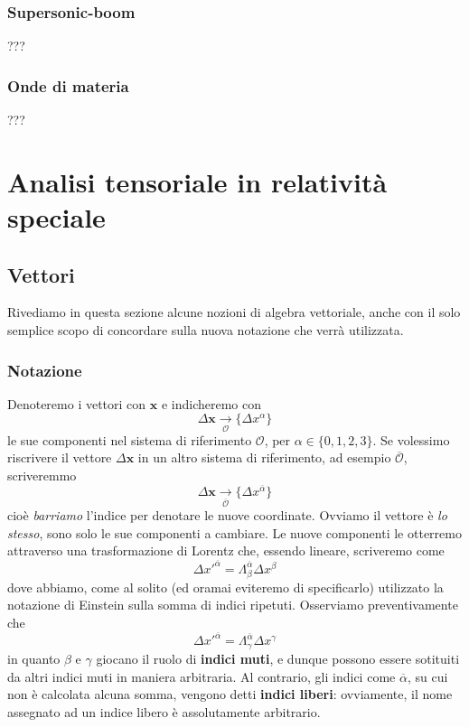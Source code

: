 \documentclass[a4paper,11pt]{book}
\theoremstyle{plain}
\theoremstyle{definition}
\begin{document}
\subsection{Supersonic-boom}
???
\subsection{Onde di materia}
???
\chapter{Analisi tensoriale in relatività speciale}
\section{Vettori}
Rivediamo in questa sezione alcune nozioni di algebra vettoriale, anche con il solo semplice scopo di concordare sulla nuova notazione che verrà utilizzata. 

\subsection{Notazione}
Denoteremo i vettori con $\textbf{x}$ e indicheremo con
\[
\Delta\textbf{x}\underset{\mathcal{O}}{\to} \{\Delta x^{\alpha} \}
\]
le sue componenti nel sistema di riferimento $\mathcal{O}$, per $\alpha\in\{0,1,2,3\}$. Se volessimo riscrivere il vettore $\Delta \textbf{x}$ in un altro sistema di riferimento, ad esempio $\overline{\mathcal{O}}$, scriveremmo
\[
\Delta \textbf{x} \underset{\mathcal{\overline{O}}}{\to} \{ \Delta x^{\overline{\alpha}} \}
\]
cioè \emph{barriamo} l'indice per denotare le nuove coordinate. Ovviamo il vettore è \emph{lo stesso}, sono solo le sue componenti a cambiare. Le nuove componenti le otterremo attraverso una trasformazione di Lorentz che, essendo lineare, scriveremo come
\begin{equation}\label{eq:vec1}
\Delta x'^{\overline{\alpha}} = \Lambda _{\beta}^{\overline{\alpha}}\Delta x^{\beta}
\end{equation}
dove abbiamo, come al solito (ed oramai eviteremo di specificarlo) utilizzato la notazione di Einstein sulla somma di indici ripetuti. Osserviamo preventivamente che
\[
\Delta x'^{\overline{\alpha}} = \Lambda _{\gamma}^{\overline{\alpha}}\Delta x^{\gamma}
\]
in quanto $\beta$ e $\gamma$ giocano il ruolo di \textbf{indici muti}, e dunque possono essere sotituiti da altri indici muti in maniera arbitraria. Al contrario, gli indici come $\overline{\alpha}$, su cui non è calcolata alcuna somma, vengono detti \textbf{indici liberi}: ovviamente, il nome assegnato ad un indice libero è assolutamente arbitrario.
\end{document}
